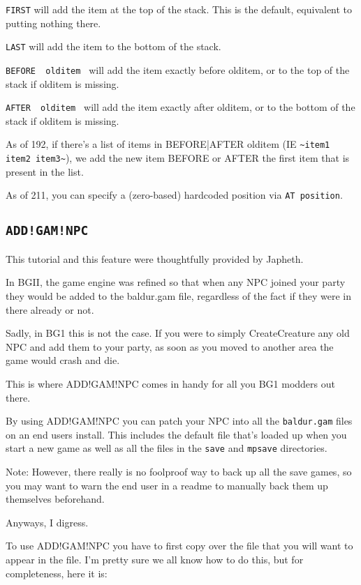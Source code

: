 \documentclass{article}
\def\ttref#1{\ahrefloc{#1}{\tt #1}}
\def\DEFINE#1{{\tt \bf #1}\label{#1}\index{#1}}
\def\t#1{{\tt #1}}
\begin{document}
  \t{FIRST} will add the item at the top of the stack.
     This is the default, equivalent to putting nothing there.

  \t{LAST} will add the item to the bottom of the stack.

  \t{BEFORE ~olditem~} will add the item exactly before olditem,
    or to the top of the stack if olditem is missing.

  \t{AFTER  ~olditem~} will add the item exactly after olditem,
    or to the bottom of the stack if olditem is missing.

As of 192, if there's a list of items in BEFORE|AFTER olditem (IE \verb+~item1 item2 item3~+),
we add the new item BEFORE or AFTER the first item that is present in the list.

As of 211, you can specify a (zero-based) hardcoded position via \verb+AT position+.

\subsection{\DEFINE{ADD!GAM!NPC}}
This tutorial and this feature were thoughtfully provided by Japheth.

In BGII, the game engine was refined so that when any NPC joined your party
they would be added to the baldur.gam file, regardless of the fact if they
were in there already or not.

Sadly, in BG1 this is not the case.  If you were to simply CreateCreature
any old NPC and add them to your party, as soon as you moved to another
area the game would crash and die.

This is where ADD!GAM!NPC comes in handy for all you BG1 modders out there.

By using ADD!GAM!NPC you can patch your NPC into all the \t{baldur.gam}
files on an end users install.  This includes the default \ttref{GAM} file
that's loaded up when you start a new game as well as all the \ttref{GAM}
files in the \t{save} and \t{mpsave} directories.

Note: However, there really is no foolproof way to back up all the save
games, so you may want to warn the end user in a readme to manually back
them up themselves beforehand.

Anyways, I digress.

To use ADD!GAM!NPC you have to first copy over the \ttref{CRE} file that
you will want to appear in the \ttref{GAM} file.  I'm pretty sure we all
know how to do this, but for completeness, here it is:
\end{document}
